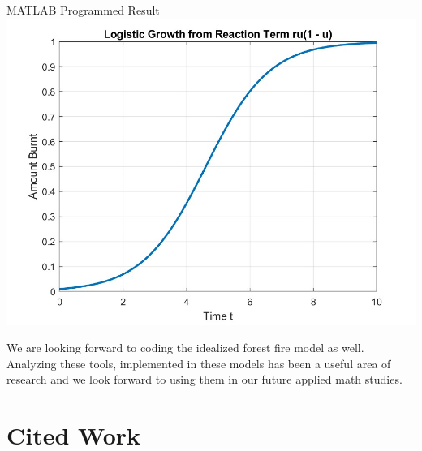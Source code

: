 \documentclass{article}
\begin{document}
%
\hfill
%
\begin{minipage}[t]{.49\textwidth}
    \centering
    MATLAB Programmed Result
    \includegraphics[scale=0.21]{Logistic_image.jpg}
    \captionsetup{justification=centering}
\end{minipage}

\vspace{1cm}
We are looking forward to coding the idealized forest fire model as well.  Analyzing these tools, implemented in these models has been a useful area of research and we look forward to using them in our future applied math studies.

\clearpage
\section{Cited Work}
\printbibliography
\end{document}
